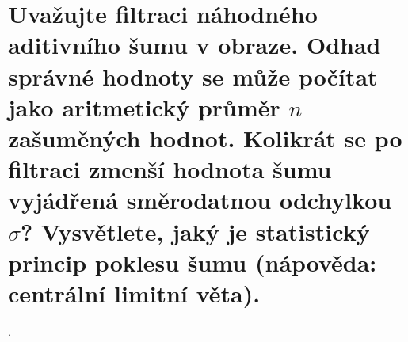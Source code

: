 \section{Uvažujte filtraci náhodného aditivního šumu v obraze. Odhad správné hodnoty se může počítat jako aritmetický 
průměr \texorpdfstring{$n$}{n} zašuměných hodnot. Kolikrát se po filtraci zmenší hodnota šumu vyjádřená směrodatnou 
odchylkou \texorpdfstring{$\sigma$}{σ}? Vysvětlete, jaký je statistický princip poklesu šumu (nápověda: centrální 
limitní věta).}.